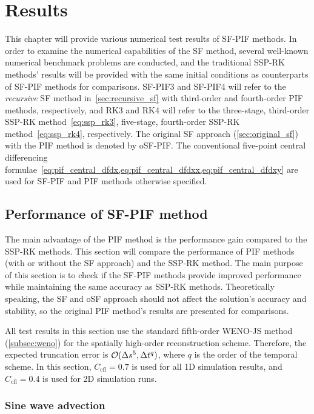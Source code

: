 \chapter{Results}\label{ch:results}

This chapter will provide various numerical test results of SF-PIF methods.
In order to examine the numerical capabilities of the SF method,
several well-known numerical benchmark problems are conducted,
and the traditional SSP-RK methods' results will be provided with the same initial conditions
as counterparts of SF-PIF methods for comparisons.
SF-PIF3 and SF-PIF4 will refer to the \textit{recursive} SF method in~\cref{sec:recursive_sf}
with third-order and fourth-order PIF methods, respectively,
and RK3 and RK4 will refer to the three-stage, third-order SSP-RK method~\cref{eq:ssp_rk3},
five-stage, fourth-order SSP-RK method~\cref{eq:ssp_rk4}, respectively.
The original SF approach (\cref{sec:original_sf}) with the PIF method is denoted by oSF-PIF\@.
The conventional five-point central differencing formulae~\cref{eq:pif_central_dfdx,eq:pif_central_dfdxx,eq:pif_central_dfdxy}
are used for SF-PIF and PIF methods otherwise specified.

\section{Performance of SF-PIF method}\label{sec:result_performance}
The main advantage of the PIF method is the performance gain compared to the SSP-RK methods.
This section will compare the performance of PIF methods (with or without the SF approach)
and the SSP-RK method. The main purpose of this section is to check if the SF-PIF methods provide
improved performance while maintaining the same accuracy as SSP-RK methods.
Theoretically speaking, the SF and oSF approach should not affect the solution's accuracy and stability,
so the original PIF method's results are presented for comparisons.

All test results in this section use the standard fifth-order WENO-JS method (\cref{subsec:weno})
for the spatially high-order reconstruction scheme.
Therefore, the expected truncation error is \( \mathcal{O}(\Delta s^{5}, \Delta t^{q}) \),
where \( q \) is the order of the temporal scheme.
In this section, \( C_{\text{cfl}} = 0.7 \) is used for all 1D simulation results,
and \( C_{\text{cfl}} = 0.4 \) is used for 2D simulation runs.

\subsection{Sine wave advection}\label{subsec:sine_wave}

